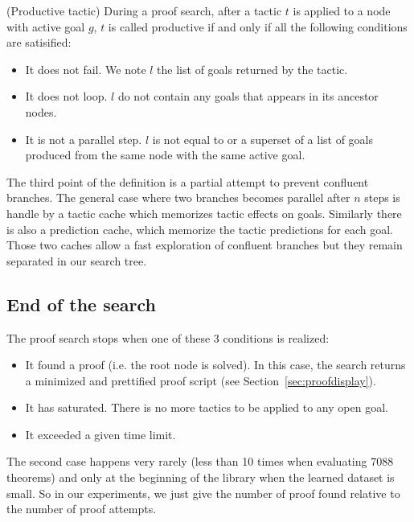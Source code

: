 \documentclass[runningheads,a4paper,draft]{svjour3}
\begin{document}
\begin{definition} (Productive tactic)
During a proof search, after a tactic $t$ is applied to a node with active goal 
$g$, $t$ is called 
productive if and only if all the following conditions are satisified:
\begin{itemize}
\item It does not fail. We note $l$ the list of goals returned by the tactic.
\item It does not loop. $l$ do not contain any goals that appears in its 
ancestor nodes.
\item It is not a parallel step. $l$ is not equal to or a superset of a list of 
goals produced from the same node with the same active goal.
\end{itemize}

The third point of the definition is a partial attempt to prevent confluent 
branches. The general 
case where two branches becomes parallel after $n$ steps is handle by a
tactic cache which memorizes tactic effects on goals. Similarly there is also a 
prediction cache, which memorize the tactic predictions for each goal. Those 
two caches allow a fast exploration of confluent branches but they remain 
separated in our search tree.


\subsection{End of the search}
The proof search stops when one of these 3 conditions is realized:
\begin{itemize}
\item It found a proof (i.e. the root node is solved). In this case, 
the search returns a minimized and 
prettified proof script (see Section~\ref{sec:proofdisplay}).
\item It has saturated. 
There is no more tactics to be applied to any open goal. 
\item It exceeded a given time limit.
\end{itemize}

The second case happens very rarely (less than 10 times when evaluating 7088 
theorems) and only at the beginning of the library when the learned dataset is 
small. So in our experiments, we just give the number of proof found relative 
to the number of proof attempts.



\end{definition}
\end{document}

